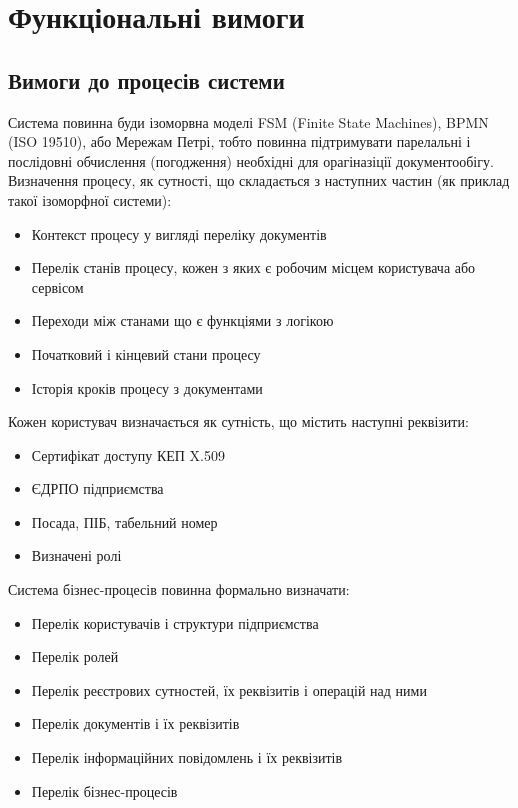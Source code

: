 \documentclass{article}
\begin{document}
\newpage
\section{Функціональні вимоги}

\subsection{Вимоги до процесів системи}
Система повинна буди ізоморвна моделі FSM (Finite State Machines), BPMN (ISO 19510), або Мережам Петрі,
тобто повинна підтримувати парелальні і послідовні обчислення (погодження) необхідні для орагіназіції
документообігу. Визначення процесу, як сутності, що складається з наступних частин (як приклад такої ізоморфної системи):

\begin{itemize}
    \item Контекст процесу у вигляді переліку документів
    \item Перелік станів процесу, кожен з яких є робочим місцем користувача або сервісом
    \item Переходи між станами що є функціями з логікою
    \item Початковий і кінцевий стани процесу
    \item Історія кроків процесу з документами
\end{itemize}

Кожен користувач визначається як сутність, що містить наступні реквізити:
\begin{itemize}
    \item Сертифікат доступу КЕП X.509
    \item ЄДРПО підприємства
    \item Посада, ПІБ, табельний номер
    \item Визначені ролі
\end{itemize}

Система бізнес-процесів повинна формально визначати:
\begin{itemize}
    \item Перелік користувачів і структури підприємства
    \item Перелік ролей
    \item Перелік реєстрових сутностей, їх реквізитів і операцій над ними
    \item Перелік документів і їх реквізитів
    \item Перелік інформаційних повідомлень і їх реквізитів
    \item Перелік бізнес-процесів
\end{itemize}
\end{document}
